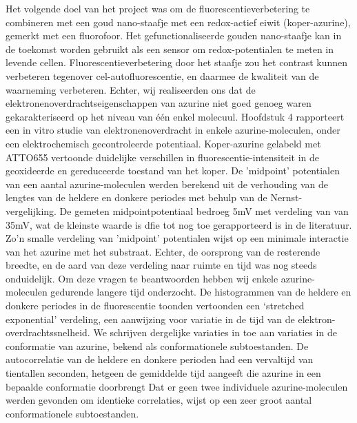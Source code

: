 Het volgende doel van het project was om de fluorescentieverbetering te combineren met een goud nano-staafje met een redox-actief eiwit (koper-azurine), gemerkt met een fluorofoor. Het gefunctionaliseerde gouden nano-staafje kan in de toekomst worden gebruikt als een sensor om redox-potentialen te meten in levende cellen. Fluorescentieverbetering door het staafje zou het contrast kunnen verbeteren tegenover cel-autofluorescentie, en daarmee de kwaliteit van de waarneming verbeteren. Echter, wij realiseerden ons dat de elektronenoverdrachtseigenschappen van azurine niet goed genoeg waren gekarakteriseerd op het niveau van één enkel molecuul. Hoofdstuk 4 rapporteert een in vitro studie van elektronenoverdracht in enkele azurine-moleculen, onder een elektrochemisch gecontroleerde potentiaal. Koper-azurine gelabeld met ATTO655 vertoonde duidelijke verschillen in fluorescentie-intensiteit in de geoxideerde en gereduceerde toestand van het koper. De ’midpoint’ potentialen van een aantal azurine-moleculen werden berekend uit de verhouding van de lengtes van de heldere en donkere periodes met behulp van de Nernst-vergelijking. De gemeten midpointpotentiaal bedroeg 5mV met verdeling van  van 35mV, wat de kleinste waarde is dfie tot nog toe  gerapporteerd is in de
literatuur. Zo'n smalle verdeling van ’midpoint’ potentialen wijst op een minimale interactie van het azurine met het substraat. Echter, de oorsprong van de resterende breedte, en de aard van deze verdeling naar ruimte en tijd was nog steeds onduidelijk. Om deze vragen te beantwoorden hebben wij enkele azurine-moleculen gedurende langere tijd onderzocht. De histogrammen van de heldere en donkere periodes in de fluorescentie toonden vertoonden een ‘stretched exponential’ verdeling, een aanwijzing voor variatie in de tijd van de elektron-overdrachtssnelheid. We schrijven dergelijke variaties in toe aan variaties in de conformatie  van azurine, bekend als conformationele subtoestanden. De autocorrelatie van de heldere en donkere perioden had een vervaltijd van tientallen seconden, hetgeen de gemiddelde tijd aangeeft die azurine in een bepaalde conformatie doorbrengt Dat er geen twee individuele azurine-moleculen werden gevonden om identieke correlaties, wijst op  een zeer groot aantal conformationele subtoestanden.